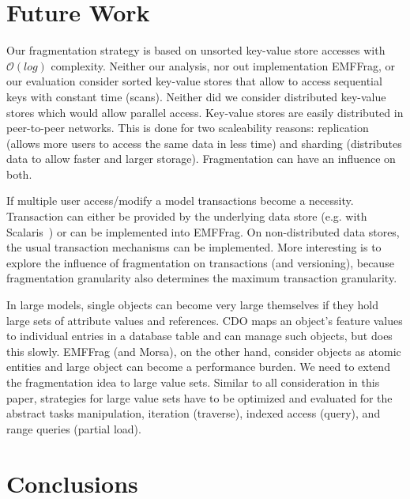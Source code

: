 \section{Future Work} 
\label{sec:future_work}

 Our fragmentation strategy is based on unsorted key-value store accesses with $\mathcal{O}(log)$ complexity. Neither our analysis, nor out  implementation EMFFrag, or our evaluation consider sorted key-value stores that allow to access sequential keys with constant time (scans). Neither did we consider distributed key-value stores which would allow parallel access. Key-value stores are easily distributed in peer-to-peer networks. This is done for two scaleability reasons: replication (allows more users to access the same data in less time) and sharding (distributes data to allow faster and larger storage). Fragmentation can have an influence on both.

 If multiple user access/modify a model transactions become a necessity. Transaction can either be provided by the underlying data store (e.g. with Scalaris~\cite{ScalarisTransactions2008}) or can be implemented into EMFFrag. On non-distributed data stores, the usual transaction mechanisms can be implemented. More interesting is to explore the influence of fragmentation on transactions (and versioning), because fragmentation granularity also determines the maximum transaction granularity.

 In large models, single objects can become very large themselves if they hold large sets of attribute values and references. CDO maps an object's feature values to individual entries in a database table and can manage such objects, but does this slowly. EMFFrag (and Morsa), on the other hand, consider objects as atomic entities and large object can become a performance burden. We need to extend the fragmentation idea to large value sets. Similar to all consideration in this paper, strategies for large value sets have to be optimized and evaluated for the abstract tasks manipulation, iteration (traverse), indexed access (query), and range queries (partial load). 

\section{Conclusions}\label{sec:conclusions}

